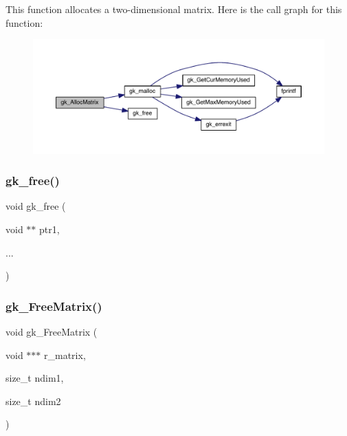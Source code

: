 This function allocates a two-\/dimensional matrix. Here is the call graph for this function\+:\nopagebreak
\begin{figure}[H]
\begin{center}
\leavevmode
\includegraphics[width=350pt]{a00110_af59ba46496f920cc424b8088f4cd7818_cgraph}
\end{center}
\end{figure}
\mbox{\label{a00110_ac8df62c4e3d0910711a9874f9cc58884}} 
\subsubsection{\texorpdfstring{gk\+\_\+free()}{gk\_free()}}
{\footnotesize\ttfamily void gk\+\_\+free (\begin{DoxyParamCaption}\item[{void $\ast$$\ast$}]{ptr1,  }\item[{}]{... }\end{DoxyParamCaption})}

\mbox{\label{a00110_ad4ae7d30c5b5a0128a25d996755f6acb}} 
\subsubsection{\texorpdfstring{gk\+\_\+\+Free\+Matrix()}{gk\_FreeMatrix()}}
{\footnotesize\ttfamily void gk\+\_\+\+Free\+Matrix (\begin{DoxyParamCaption}\item[{void $\ast$$\ast$$\ast$}]{r\+\_\+matrix,  }\item[{size\+\_\+t}]{ndim1,  }\item[{size\+\_\+t}]{ndim2 }\end{DoxyParamCaption})}

